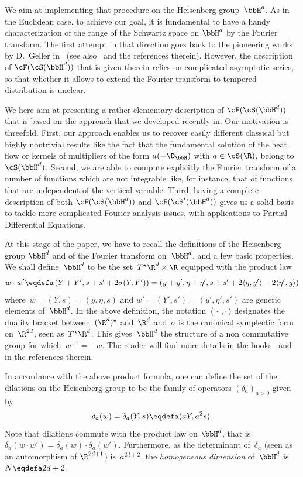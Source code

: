 We aim at implementing that procedure on the Heisenberg group~$\bbH^d$. As in the Euclidean case, to achieve our goal, it is fundamental to have a handy characterization of the range of the Schwartz space on $\bbH^d$ by the Fourier transform. The first attempt in that direction goes back to the pioneering works by D.~Geller in~\cite{geller, geller2} (see also~\cite{astengo2,F,thangavelu2} and the references therein). However, the description of $\cF(\cS(\bbH^d))$ that is given therein relies on complicated asymptotic series, so that whether it allows to extend the Fourier transform to tempered distribution is unclear.

We here aim at presenting a rather elementary description of $\cF(\cS(\bbH^d))$ that is based on the approach that we developed recently in\cite{bcdFHspace}. Our motivation is threefold. First, our approach enables us to recover easily different classical but highly nontrivial results like the fact that the fundamental solution of the heat flow or kernels of multipliers of the form $a(-\D_\bbH)$ with $a\in\cS(\R)$, belong to $\cS(\bbH^d)$. Second, we are able to compute explicitly the Fourier transform of a number of functions which are not integrable like, for instance, that of functions that are independent of the vertical variable. Third, having a complete description of both $\cF(\cS(\bbH^d))$ and $\cF(\cS'(\bbH^d))$ gives us a solid basis to tackle more complicated Fourier analysis issues, with applications to Partial Differential Equations.

At this stage of the paper, we have to recall the definitions of the Heisenberg group $\bbH^d$ and of the Fourier transform on~$\bbH^d$, and a few basic properties. We shall define~$\bbH^d$ to be the set~$T^\star\R^d \times\R$ equipped with the product law
\[
w\cdot w'\eqdefa
\left(Y+Y', s+s'+ 2\sigma(Y,Y')\right) = \left(y+y', \eta+\eta', s+s'+2 \langle \eta,y'\rangle -2\langle \eta',y\rangle\right)
\]
where~$w=(Y,s)=(y,\eta,s)$ and $w'=(Y',s')=(y',\eta',s')$ are generic elements of~$\bbH^d$. In the above definition, the notation~$\langle{\,\cdot\,,\cdot\,}\rangle$ designates the duality bracket between~$(\R^d)^\star $ and~$\R^d$ and~$\sigma$ is the canonical symplectic form on~$\R^{2d}$, seen as~$T^\star\R^d$. This gives~$\bbH^d$ the structure of a non commutative group for which~$w^{-1}=-w$. The reader will find more details in the books~\cite{bfg, farautharzallah, fisher, folland, follandstein, stein2, taylor1, thangavelu} and in the references therein.

In accordance with the above product formula, one can define the set of the dilations on the Heisenberg group to be the family of operators $(\delta_a)_{a>0}$ given by
\begin{equation}\label{defdilations}
\delta_a(w) = \delta_a (Y,s) \eqdefa (aY,a^2s).
\end{equation}
Note that dilations commute with the product law on $\bbH^d$, that is $\delta_a(w\cdot w') = \delta_a(w) \cdot \delta_a (w')$. Furthermore, as the determinant of~$\delta_a$ (seen as an automorphism of $\R^{2d+1}$) is~$a^{2d+2}$, the \emph{homogeneous dimension} of~$\bbH^d$ is~$N\eqdefa2d+2$.

